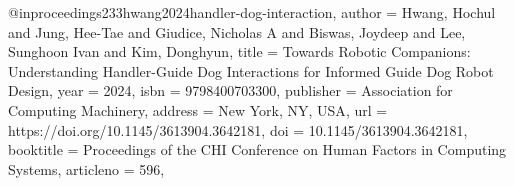@inproceedings{233hwang2024handler-dog-interaction,
author = {Hwang, Hochul and Jung, Hee-Tae and Giudice, Nicholas A and Biswas, Joydeep and Lee, Sunghoon Ivan and Kim, Donghyun},
title = {Towards Robotic Companions: Understanding Handler-Guide Dog Interactions for Informed Guide Dog Robot Design},
year = {2024},
isbn = {9798400703300},
publisher = {Association for Computing Machinery},
address = {New York, NY, USA},
url = {https://doi.org/10.1145/3613904.3642181},
doi = {10.1145/3613904.3642181},
booktitle = {Proceedings of the CHI Conference on Human Factors in Computing Systems},
articleno = {596},
}